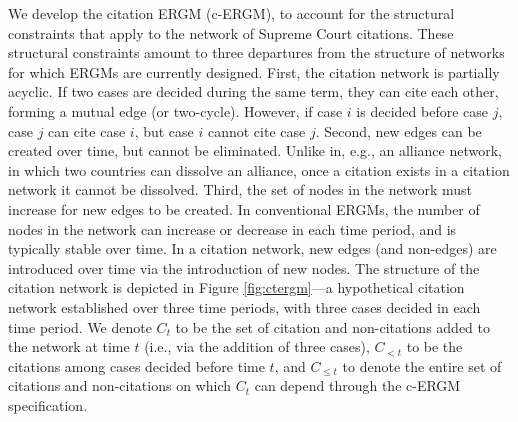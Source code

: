 \documentclass{cup-pan}
\begin{document}
We develop the citation ERGM (c-ERGM), to account for the structural constraints that apply to the network of Supreme Court citations. These structural constraints amount to three departures from the structure of networks for which ERGMs are currently designed. First, the citation network is partially acyclic. If two cases are decided during the same term, they can cite each other, forming a mutual edge (or two-cycle). However, if case $i$ is decided before case $j$, case $j$ can cite case $i$, but case $i$ cannot cite case $j$. Second, new edges can be created over time, but cannot be eliminated. Unlike in, e.g., an alliance network, in which two countries can dissolve an alliance, once a citation exists in a citation network it cannot be dissolved. Third, the set of nodes in the network must increase for new edges to be created. In conventional ERGMs, the number of nodes in the network can increase or decrease in each time period, and is typically stable over time. In a citation network, new edges (and non-edges) are introduced over time via the introduction of new nodes. The structure of the citation network is depicted in Figure \ref{fig:ctergm}---a hypothetical citation network established over three time periods, with three cases decided in each time period. We denote $C_t$ to be the set of citation and non-citations added to the network at time $t$ (i.e., via the addition of three cases), $C_{ <t}$ to be the citations among cases decided before time $t$, and $C_{ \leq t}$ to denote the entire set of citations and non-citations on which $C_t$ can depend through the c-ERGM specification.
\end{document}
